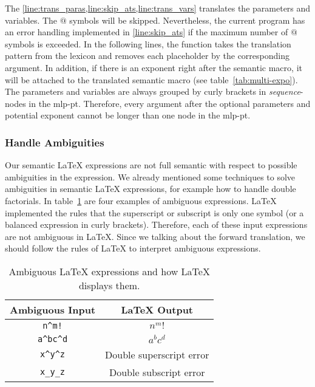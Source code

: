 The \cref{line:trans_paras,line:skip_ats,line:trans_vars} translates the parameters and variables. The $@$ symbols will be skipped. Nevertheless, the current program has an error handling implemented in \cref{line:skip_ats} if the maximum number of $@$ symbols is exceeded. In the following lines, the function takes the translation pattern from the lexicon and removes each placeholder by the corresponding argument. In addition, if there is an exponent right after the semantic macro, it will be attached to the translated semantic macro (see table~\ref{tab:multi-expo}). The parameters and variables are always grouped by curly brackets in \textit{sequence}-nodes in the \gls{mlp-pt}. Therefore, every argument after the optional parameters and potential exponent cannot be longer than one node in the \gls{mlp-pt}.

\subsubsection{Handle Ambiguities}\label{subsec:ambiguities}
Our semantic \LaTeX{} expressions are not full semantic with respect to possible ambiguities in the expression. We already mentioned some techniques to solve ambiguities in semantic \LaTeX{} expressions, for example how to handle double factorials. In table~\ref{tab:amb-latex} are four examples of ambiguous expressions. \LaTeX{} implemented the rules that the superscript or subscript is only one symbol (or a balanced expression in curly brackets). Therefore, each of these input expressions are not ambiguous in \LaTeX. Since we talking about the forward translation, we should follow the rules of \LaTeX{} to interpret ambiguous expressions.

\begin{table}[ht]
\centering
\begin{tabular}{cc}
	\hline
	Ambiguous Input & \LaTeX{} Output\\
	\hline
	\verb|n^m!| & $n^m!$\\
	\verb|a^bc^d| & $a^bc^d$\\
	\verb|x^y^z| & Double superscript error\\
	\verb|x_y_z| & Double subscript error\\
	\hline
\end{tabular}
\caption{Ambiguous \LaTeX{} expressions and how \LaTeX{} displays them.}
\label{tab:amb-latex}
\end{table}


